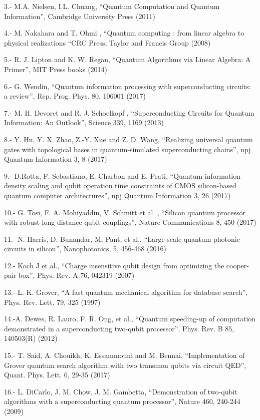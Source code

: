 3.- M.A. Nielsen, I.L. Chuang, “Quantum Computation and Quantum Information”, Cambridge University Press (2011)

4.- M. Nakahara and T. Ohmi , “Quantum computing : from linear algebra to physical realizations “CRC Press, Taylor and Francis Group (2008)

5.- R. J. Lipton and K. W. Regan, “Quantum Algorithms via Linear Algebra: A Primer”, MIT Press books (2014)

6.- G. Wendin, “Quantum information processing with superconducting circuits: a review”, Rep. Prog.  Phys. 80, 106001 (2017)

7.- M. H. Devoret and R. J. Schoelkopf , “Superconducting Circuits for Quantum Information: An Outlook”, Science 339, 1169 (2013)

8.- Y. Hu, Y. X. Zhao, Z.-Y. Xue and Z. D. Wang, “Realizing universal quantum gates with topological bases in quantum-simulated superconducting chains”, npj Quantum Information 3, 8 (2017)

9.- D.Rotta, F. Sebastiano, E. Charbon and E. Prati, “Quantum information density scaling and qubit operation time constraints of CMOS silicon-based quantum computer architectures”, npj Quantum Information 3, 26 (2017)

10.- G. Tosi, F. A. Mohiyaddin, V. Schmitt et al. , “Silicon quantum processor with robust long-distance qubit couplings”, Nature Communications 8, 450 (2017)

11.- N. Harris, D. Bunandar, M. Pant, et al., “Large-scale quantum photonic circuits in silicon”, Nanophotonics, 5, 456-468 (2016)

12.- Koch J et al., “Charge insensitive qubit design from optimizing the cooper-pair box”, Phys. Rev. A 76, 042319 (2007)

13.- L. K. Grover, “A fast quantum mechanical algorithm for database search”, Phys. Rev. Lett. 79, 325 (1997)


14.-A. Dewes, R. Lauro, F. R. Ong, et al., “Quantum speeding-up of computation demonstrated in a superconducting two-qubit processor”, Phys. Rev. B 85, 140503(R) (2012)

15.- T. Said, A. Chouikh, K. Essammouni and M. Bennai, “Implementation of Grover quantum search algorithm with two transmon qubits via circuit QED”, Quant. Phys. Lett. 6, 29-35 (2017)

16.- L. DiCarlo, J. M. Chow, J. M. Gambetta, “Demonstration of two-qubit algorithms with a superconducting quantum processor”, Nature 460, 240-244 (2009)

